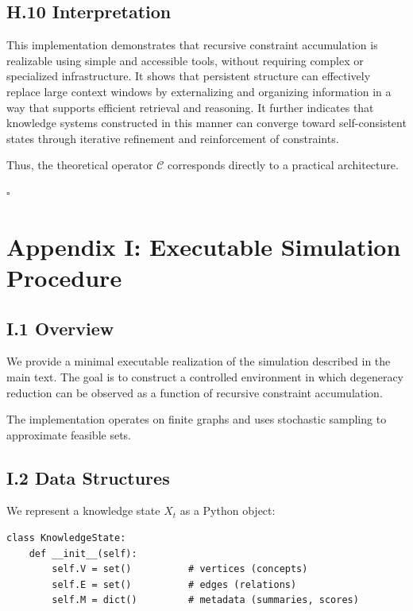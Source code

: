 \documentclass[12pt, oneside]{article}
\theoremstyle{plain}
\theoremstyle{definition}
\theoremstyle{remark}
\begin{document}
\subsection{H.10 Interpretation}

This implementation demonstrates that recursive constraint accumulation is realizable using simple and accessible tools, without requiring complex or specialized infrastructure. It shows that persistent structure can effectively replace large context windows by externalizing and organizing information in a way that supports efficient retrieval and reasoning. It further indicates that knowledge systems constructed in this manner can converge toward self-consistent states through iterative refinement and reinforcement of constraints.

Thus, the theoretical operator $\mathcal{C}$ corresponds directly to a practical architecture.

\hfill $\square$

\section{Appendix I: Executable Simulation Procedure}

\subsection{I.1 Overview}

We provide a minimal executable realization of the simulation described in the main text. The goal is to construct a controlled environment in which degeneracy reduction can be observed as a function of recursive constraint accumulation.

The implementation operates on finite graphs and uses stochastic sampling to approximate feasible sets.

\subsection{I.2 Data Structures}

We represent a knowledge state $X_t$ as a Python object:

\begin{verbatim}
class KnowledgeState:
    def __init__(self):
        self.V = set()          # vertices (concepts)
        self.E = set()          # edges (relations)
        self.M = dict()         # metadata (summaries, scores)
\end{verbatim}
\end{document}
